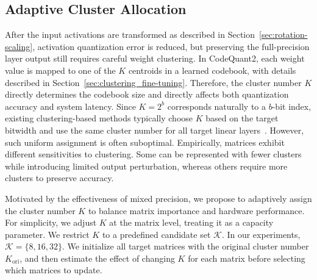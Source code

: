 \documentclass{article}
\begin{document}
\subsection{Adaptive Cluster Allocation}
\label{sec:aca}
After the input activations are transformed as described in Section~\ref{sec:rotation-scaling}, activation quantization error is reduced, but preserving the full-precision layer output still requires careful weight clustering. In CodeQuant2, each weight value is mapped to one of the $K$ centroids in a learned codebook, with details described in Section~\ref{sec:clustering_fine-tuning}. Therefore, the cluster number $K$ directly determines the codebook size and directly affects both quantization accuracy and system latency. Since $K=2^b$ corresponds naturally to a $b$-bit index, existing clustering-based methods typically choose $K$ based on the target bitwidth and use the same cluster number for all target linear layers~\cite{kim2023squeezellm,yin2026codequant}. However, such uniform assignment is often suboptimal. Empirically, matrices exhibit different sensitivities to clustering. Some can be represented with fewer clusters while introducing limited output perturbation, whereas others require more clusters to preserve accuracy.

Motivated by the effectiveness of mixed precision, we propose to adaptively assign the cluster number $K$ to balance matrix importance and hardware performance. For simplicity, we adjust $K$ at the matrix level, treating it as a capacity parameter. We restrict $K$ to a predefined candidate set $\mathcal{K}$.
In our experiments, $\mathcal{K}=\{8,16,32\}$. We initialize all target matrices with the original cluster number $K_{\mathrm{ori}}$, and then estimate the effect of changing $K$ for each matrix before selecting which matrices to update. 
\end{document}
